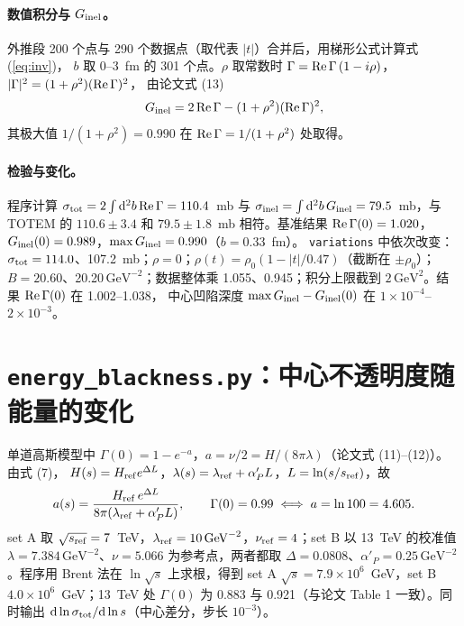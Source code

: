 \documentclass[11pt,a4paper]{ctexart}
\newcommand{\dd}{\mathrm d}
\newcommand{\GeVt}{\,\mathrm{GeV}^2}
\newcommand{\GeVm}{\,\mathrm{GeV}^{-2}}
\begin{document}
\paragraph{数值积分与 $G_{\rm inel}$。}外推段 200 个点与 290 个数据点（取代表 $|t|$）合并后，用梯形公式计算式 (\ref{eq:inv})，
$b$ 取 0--3~fm 的 301 个点。$\rho$ 取常数时 $\Gamma={\rm Re}\,\Gamma\,(1-i\rho)$，$|\Gamma|^2=(1+\rho^2)({\rm Re}\,\Gamma)^2$，
由论文式 (13)
\begin{equation}
G_{\rm inel}=2\,{\rm Re}\,\Gamma-(1+\rho^2)({\rm Re}\,\Gamma)^2 ,
\end{equation}
其极大值 $1/(1+\rho^2)=0.990$ 在 ${\rm Re}\,\Gamma=1/(1+\rho^2)$ 处取得。

\paragraph{检验与变化。}程序计算 $\sigma_{\rm tot}=2\int\dd^2b\,{\rm Re}\,\Gamma=110.4$~mb 与
$\sigma_{\rm inel}=\int\dd^2b\,G_{\rm inel}=79.5$~mb，与 TOTEM 的 $110.6\pm3.4$ 和 $79.5\pm1.8$~mb 相符。基准结果
${\rm Re}\,\Gamma(0)=1.020$，$G_{\rm inel}(0)=0.989$，$\max G_{\rm inel}=0.990$（$b=0.33$~fm）。
\texttt{variations} 中依次改变：$\sigma_{\rm tot}=114.0$、107.2~mb；$\rho=0$；$\rho(t)=\rho_0(1-|t|/0.47)$（截断在 $\pm\rho_0$）；
$B=20.60$、20.20$\GeVm$；数据整体乘 1.055、0.945；积分上限截到 $2\GeVt$。结果 ${\rm Re}\,\Gamma(0)$ 在 1.002--1.038，
中心凹陷深度 $\max G_{\rm inel}-G_{\rm inel}(0)$ 在 $1\times10^{-4}$--$2\times10^{-3}$。

\section{\texttt{energy\_blackness.py}：中心不透明度随能量的变化}

单道高斯模型中 $\Gamma(0)=1-e^{-a}$，$a=\nu/2=H/(8\pi\lambda)$（论文式 (11)--(12)）。由式 (7)，
$H(s)=H_{\rm ref}e^{\Delta L}$，$\lambda(s)=\lambda_{\rm ref}+\alpha'_PL$，$L=\ln(s/s_{\rm ref})$，故
\begin{equation}
a(s)=\frac{H_{\rm ref}\,e^{\Delta L}}{8\pi(\lambda_{\rm ref}+\alpha'_PL)},\qquad
\Gamma(0)=0.99\iff a=\ln100=4.605 .
\end{equation}
set A 取 $\sqrt{s_{\rm ref}}=7$~TeV，$\lambda_{\rm ref}=10\GeVm$，$\nu_{\rm ref}=4$；set B 以 13~TeV 的校准值
$\lambda=7.384\GeVm$、$\nu=5.066$ 为参考点，两者都取 $\Delta=0.0808$、$\alpha'_P=0.25\GeVm$。程序用 Brent 法在
$\ln\sqrt s$ 上求根，得到 set A $\sqrt s=7.9\times10^6$~GeV，set B $4.0\times10^6$~GeV；13~TeV 处 $\Gamma(0)$ 为
0.883 与 0.921（与论文 Table 1 一致）。同时输出 $\dd\ln\sigma_{\rm tot}/\dd\ln s$（中心差分，步长 $10^{-3}$）。
\end{document}
